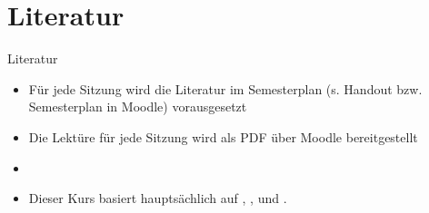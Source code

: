 %
\section{Literatur}

\begin{frame}{Literatur}

\begin{itemize}
	\item Für jede Sitzung wird die Literatur im Semesterplan (s. Handout bzw. Semesterplan in Moodle) vorausgesetzt
	\item Die Lektüre für jede Sitzung wird als PDF über Moodle bereitgestellt
	\item[]
	\item Dieser Kurs basiert hauptsächlich auf , ,  und \citet{Abramowski2016a}.
\end{itemize}		

\end{frame}

